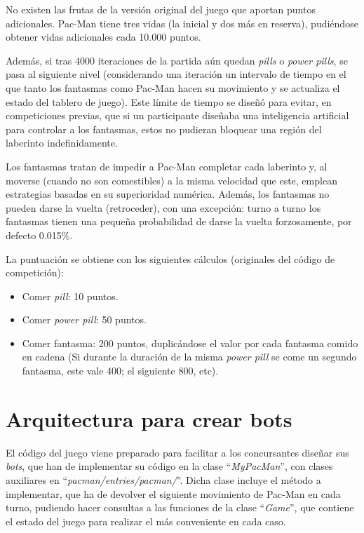 No existen las frutas de la versión original del juego que aportan puntos adicionales.
Pac-Man tiene tres vidas (la inicial y dos más en reserva), pudiéndose obtener vidas adicionales cada 10.000 puntos.

Además, si tras 4000 iteraciones de la partida aún quedan \textit{pills} o \textit{power pills}, se pasa al siguiente nivel (considerando una iteración un intervalo de tiempo en el que tanto los fantasmas como Pac-Man hacen su movimiento y se actualiza el estado del tablero de juego). Este límite de tiempo se diseñó para evitar, en competiciones previas, que si un participante diseñaba una inteligencia artificial para controlar a los fantasmas, estos no pudieran bloquear una región del laberinto indefinidamente.
 
Los fantasmas tratan de impedir a Pac-Man completar cada laberinto y, al moverse (cuando no son comestibles) a la misma velocidad que este, emplean estrategias basadas en su superioridad numérica. Además, los fantasmas no pueden darse la vuelta (retroceder), con una excepción: turno a turno los fantasmas tienen una pequeña probabilidad de darse la vuelta forzosamente, por defecto 0.015\%.
 
La puntuación se obtiene con los siguientes cálculos (originales del código de competición):
\begin{itemize}
\item Comer \textit{pill}: 10 puntos.
\item Comer \textit{power pill}: 50 puntos.
\item Comer fantasma: 200 puntos, duplicándose el valor por cada fantasma comido en cadena (Si durante la duración de la misma \textit{power pill} se come un segundo fantasma, este vale 400; el siguiente 800, etc).
\end{itemize}

\section{Arquitectura para crear bots}
El código del juego viene preparado para facilitar a los concursantes diseñar sus \textit{bots}, que han de implementar su código en la clase ``\textit{MyPacMan}'', con clases auxiliares en ``\textit{pacman/entries/pacman/}''. Dicha clase incluye el método a implementar, que ha de devolver el siguiente movimiento de Pac-Man en cada turno, pudiendo hacer consultas a las funciones de la clase ``\textit{Game}'', que contiene el estado del juego para realizar el más conveniente en cada caso.
 
